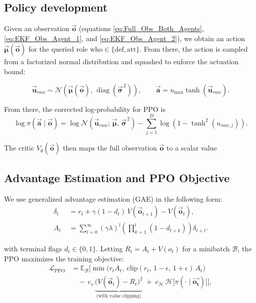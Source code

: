 \subsection{Policy development}


Given an observation \(\vec{\mathbf{o}}\) (equations \ref{eq:Full_Obs_Both_Agents}, \ref{eq:EKF_Obs_Agent_1}, and \ref{eq:EKF_Obs_Agent_2}), we obtain an action $\vec{\boldsymbol{\mu}}(\vec{\mathbf{o}})$ for the queried role \(\mathrm{who}\in\{\mathrm{def},\mathrm{att}\}\). From there, the action is sampled from a factorized normal distribution and squashed to enforce the actuation bound:

\[
\vec{\mathbf{u}}_{raw} \sim \mathcal{N}\!\left(\vec{\boldsymbol{\mu}}(\vec{\mathbf{o}}),\, \operatorname{diag}\!\left(\vec{\boldsymbol{\sigma}}^{\,2}\right)\right),
\qquad
\vec{\mathbf{a}} = u_{\max}\tanh\!\left(\vec{\mathbf{u}}_{raw}\right).
\]

From there, the corrected log-probability for PPO is
\[
\log \pi(\vec{\mathbf{a}} \mid \vec{\mathbf{o}})
=
\log \mathcal{N}\!\left(\vec{\mathbf{u}}_{raw};\, \vec{\boldsymbol{\mu}},\, \vec{\boldsymbol{\sigma}}^{\,2}\right)
-
\sum_{j=1}^{D}\log\!\left(1-\tanh^2(u_{raw,j})\right).
\]


The critic \(V_\theta(\vec{\mathbf{o}})\) then maps the full observation \(\vec{\mathbf{o}}\) to a scalar value



\subsection{Advantage Estimation and PPO Objective}
We use generalized advantage estimation (GAE) in the following form:
\[
\begin{aligned}
\delta_t \;&= r_t + \gamma(1-d_t)\,V(\vec{\mathbf{o}}_{t+1}) - V(\vec{\mathbf{o}}_{t}),\\[4pt]
A_t \;&= \sum_{l=0}^{\infty} (\gamma\lambda)^l
\left(\prod_{k=1}^{l} (1-d_{t+k})\right)\delta_{t+l}.
\end{aligned}
\]

with terminal flags \(d_t\in\{0,1\}\). Letting  \(R_t=A_t+V(o_t)\) for a minibatch \(\mathcal{B}\), the PPO maximizes the training objective:
\begin{align*}
\mathcal{L}_{\text{PPO}}
&= \mathbb{E}_{\mathcal{B}}\Big[
\min\!\big(r_t A_t,\ \mathrm{clip}(r_t,\,1{-}\epsilon,\,1{+}\epsilon)\,A_t\big)
\\
&\quad -\, c_v\,\underbrace{\big(V(\vec{\mathbf{o}}_t) - R_t\big)^2}_{\text{(with value clipping)}}
\;+\; c_{\mathcal{H}}\,\mathcal{H}\!\big[\pi(\cdot\!\mid \vec{\mathbf{o_t}})\big]
\Big],
\end{align*}

